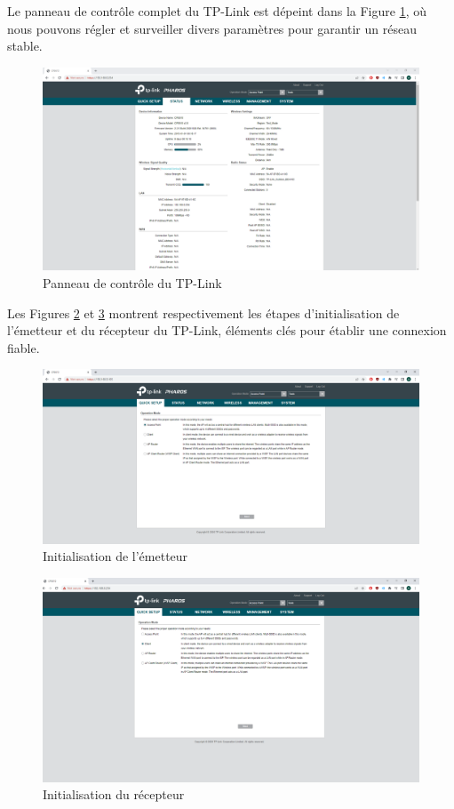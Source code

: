Le panneau de contrôle complet du TP-Link est dépeint dans la Figure \ref{Chap2.3.7}, où nous pouvons régler et surveiller divers paramètres pour garantir un réseau stable.

\begin{figure}[H]
\centering
\includegraphics[width=15cm]{Images/tplink34.png}
\caption{Panneau de contrôle du TP-Link}
\label{Chap2.3.7}
\end{figure}

Les Figures \ref{Chap2.3.8} et \ref{Chap2.3.9} montrent respectivement les étapes d'initialisation de l'émetteur et du récepteur du TP-Link, éléments clés pour établir une connexion fiable.

\begin{figure}[H]
\centering
\includegraphics[width=15cm]{Images/tplink35.png}
\caption{Initialisation de l'émetteur}
\label{Chap2.3.8}
\end{figure}

\begin{figure}[H]
\centering
\includegraphics[width=15cm]{Images/tplink36.png}
\caption{Initialisation du récepteur}
\label{Chap2.3.9}
\end{figure}

